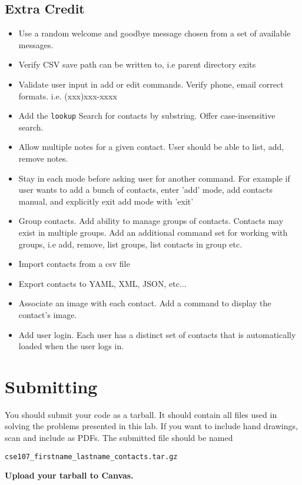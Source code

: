 \documentclass[11pt]{cselabheader}
\begin{document}
\subsection{Extra Credit}
\begin{itemize}
\item Use a random welcome and goodbye message chosen from a set of available
    messages.
\item Verify CSV save path can be written to, i.e parent directory exits
\item Validate user input in add or edit commands. Verify phone, email correct
    formats. i.e.  (xxx)xxx-xxxx
\item Add the \texttt{lookup} Search for contacts by substring. Offer
    case-insensitive search.
\item Allow multiple notes for a given contact. User should be able to list, add,
    remove notes.
\item Stay in each mode before asking user for another command. For example if user
    wants to add a bunch of contacts, enter ’add’ mode, add contacts manual, and explicitly
    exit add mode with ’exit’
\item Group contacts. Add ability to manage groups of contacts. Contacts may exist in
    multiple groups. Add an additional command set for working with groups, i.e add,
    remove, list groups, list contacts in group etc.
\item Import contacts from a csv file
\item Export contacts to YAML, XML, JSON, etc...
\item Associate an image with each contact. Add a command to display the contact’s
    image.
\item Add user login. Each user has a distinct set of contacts that is automatically loaded
    when the user logs in.
\end{itemize}

\newpage
\section{Submitting}

You should submit your code as a tarball. It should contain all files used in
solving the problems presented in this lab.  If you want to include hand
drawings, scan and include as PDFs.  The submitted file should be named

\begin{center}
  \texttt{cse107\_firstname\_lastname\_contacts.tar.gz}
\end{center}

\begin{center}
  \textbf{Upload your tarball to Canvas.}
\end{center}
\end{document}
